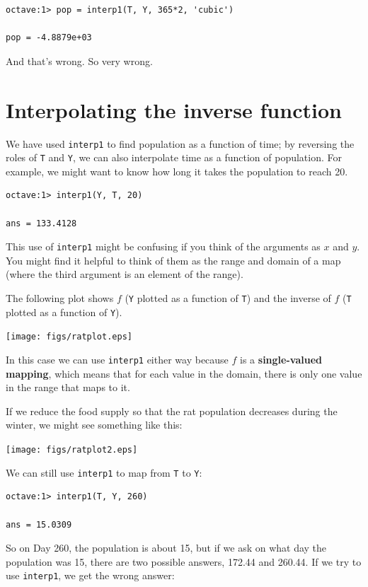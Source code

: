 \documentclass{book}
\begin{document}
\begin{verbatim}
octave:1> pop = interp1(T, Y, 365*2, 'cubic')

pop = -4.8879e+03
\end{verbatim}

And that's wrong. So very wrong.


\section{Interpolating the inverse function}

We have used {\tt interp1} to find population as a function of time;
by reversing the roles of {\tt T} and {\tt Y}, we can also interpolate
time as a function of population. For example, we might want to know
how long it takes the population to reach 20.

\begin{verbatim}
octave:1> interp1(Y, T, 20)

ans = 133.4128
\end{verbatim}

This use of {\tt interp1} might be confusing if you think of the
arguments as $x$ and $y$. You might find it helpful to think of them
as the range and domain of a map (where the third argument is
an element of the range).

The following plot shows $f$ ({\tt Y} plotted as a function of {\tt T})
and the inverse of $f$ ({\tt T} plotted as a function of {\tt Y}).

\beforefig
\centerline{\texttt{[image: figs/ratplot.eps]}}

In this case we can use {\tt interp1} either way because $f$ is
a {\bf single-valued mapping}, which means that for each value in
the domain, there is only one value in the range that maps to it.

If we reduce the food supply so that the rat population decreases
during the winter, we might see something like this:

\beforefig 
\centerline{\texttt{[image: figs/ratplot2.eps]}}

We can still use {\tt interp1} to map from {\tt T} to {\tt Y}:

\begin{verbatim}
octave:1> interp1(T, Y, 260)

ans = 15.0309
\end{verbatim}

So on Day 260, the population is about 15, but if we ask on what
day the population was 15, there are two possible answers, 172.44
and 260.44. If we try to use {\tt interp1}, we get the wrong answer:
\end{document}
